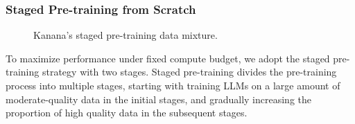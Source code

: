 \subsubsection{Staged Pre-training from Scratch}
\label{subsec:pretrain_staged_pretrain}

\begin{figure}[h]
    \centering
    \hfill
    \caption{Kanana's staged pre-training data mixture.}
    \label{fig:pre_data_stats}
\end{figure}


\begin{table}[h]
\centering
{}
\caption{
Performance of from-scratch Kanana models at the end of each training stage.
} \label{table:from-scratch}
\end{table}

To maximize performance under fixed compute budget, we adopt the staged pre-training strategy \citep{minicpm, gemma, opencoder, yi-lightning, granite} with two stages.
Staged pre-training divides the pre-training process into multiple stages, starting with training LLMs on a large amount of moderate-quality data in the initial stages, and gradually increasing the proportion of high quality data in the subsequent stages. 

